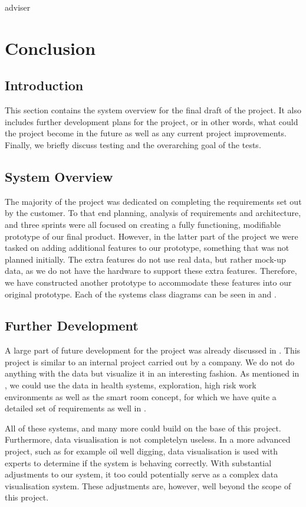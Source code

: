 adviser\documentclass[../document]{subfiles}
\begin{document}
\section{Conclusion}

\subsection{Introduction}
This section contains the system overview for the final draft of the project. It also includes further development plans for the project, or in other words, what could the project become in the future as well as any current project improvements. Finally, we briefly discuss testing and the overarching goal of the tests.

\subsection{System Overview}
The majority of the project was dedicated on completing the requirements set out by the customer. To that end planning, analysis of requirements and architecture, and three sprints were all focused on creating a fully functioning, modifiable prototype of our final product. However, in the latter part of the project we were tasked on adding additional features to our prototype, something that was not planned initially. The extra features do not use real data, but rather mock-up data, as we do not have the hardware to support these extra features. Therefore, we have constructed another prototype to accommodate these features into our original prototype. Each of the systems class diagrams can be seen in  and .

\subsection{Further Development}
A large part of future development for the project was already discussed in . This project is similar to an internal project carried out by a company. We do not do anything with the data but visualize it in an interesting fashion. As mentioned in , we could use the data in health systems, exploration, high risk work environments as well as the smart room concept, for which we have quite a detailed set of requirements as well in . 

All of these systems, and many more could build on the base of this project. Furthermore, data visualisation is not completelyn useless. In a more advanced project, such as for example oil well digging, data visualisation is used with experts to determine if the system is behaving correctly. With substantial adjustments to our system, it too could potentially serve as a complex data visualisation system. These adjustments are, however, well beyond the scope of this project.
\end{document}
